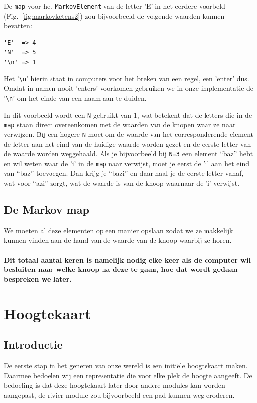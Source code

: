 \documentclass{article}
\begin{document}
De \texttt{map} voor het \texttt{MarkovElement} van de letter 'E' in het eerdere voorbeld (Fig.~\ref{fig:markovketens2}) zou bijvoorbeeld de volgende waarden kunnen bevatten:

\begin{lstlisting}
'E'  => 4
'N'  => 5
'\n' => 1
\end{lstlisting}

Het '\texttt{\textbackslash n}' hierin staat in computers voor het breken van een regel, een 'enter' dus. Omdat in namen nooit 'enters' voorkomen gebruiken we in onze implementatie de '\texttt{\textbackslash n}' om het einde van een naam aan te duiden.

In dit voorbeeld wordt een \texttt{N} gebruikt van 1, wat betekent dat de letters die in de \texttt{map} staan direct overeenkomen met de waarden van de knopen waar ze naar verwijzen. Bij een hogere \texttt{N} moet om de waarde van het corresponderende element de letter aan het eind van de huidige waarde worden gezet en de eerste letter van de waarde worden weggehaald. Als je bijvoorbeeld bij \texttt{N=3} een element “baz” hebt en wil weten waar de 'i' in de \texttt{map} naar verwijst, moet je eerst de 'i' aan het eind van “baz” toevoegen. Dan krijg je “bazi” en daar haal je de eerste letter vanaf, wat voor “azi” zorgt, wat de waarde is van de knoop waarnaar de 'i' verwijst.

\subsection{De Markov map}

We moeten al deze elementen op een manier opslaan zodat we ze makkelijk kunnen vinden aan de hand van de waarde van de knoop waarbij ze horen. 
\\\\
\textbf{Dit totaal aantal keren is namelijk nodig elke keer als de computer wil besluiten naar welke knoop na deze te gaan, hoe dat wordt gedaan bespreken we later.}

\newpage

\section{Hoogtekaart}

\subsection{Introductie}

De eerste stap in het generen van onze wereld is een initiële hoogtekaart maken. Daarmee bedoelen wij een representatie die voor elke plek de hoogte aangeeft. De bedoeling is dat deze hoogtekaart later door andere modules kan worden aangepast, de rivier module zou bijvoorbeeld een pad kunnen weg eroderen.
\end{document}
